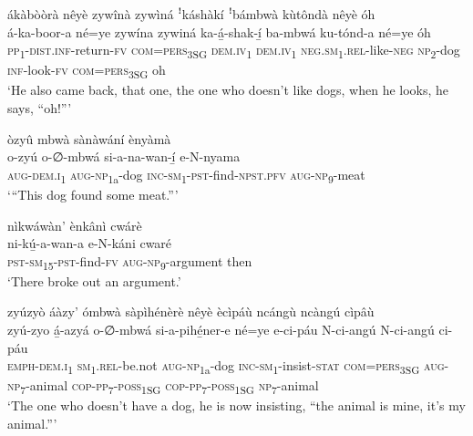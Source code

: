 ákàbòòrà nêyè zywînà zywìná ꜝkáshàkí ꜝbámbwà kùtôndà nêyè óh\\
\gll á-ka-boor-a      né=ye    zywína zywiná  ka-á̲-shak-í̲      ba-mbwá  ku-tónd-a  né=ye    óh \\
\textsc{pp}\textsubscript{1}{}-\textsc{dist}.\textsc{inf}{}-return-\textsc{fv}  \textsc{com}=\textsc{pers}\textsubscript{3SG}  \textsc{dem}.\textsc{iv}\textsubscript{1}
\textsc{dem}.\textsc{iv}\textsubscript{1} \textsc{neg}.\textsc{sm}\textsubscript{1}.\textsc{rel}{}-like-\textsc{neg}  \textsc{np}\textsubscript{2}{}-dog  \textsc{inf}{}-look-\textsc{fv}  \textsc{com}=\textsc{pers}\textsubscript{3SG} oh\\
\glt ‘He also came back, that one, the one who doesn’t like dogs, when he looks, he says, “oh!”’\bigskip

\newpage
òzyû mbwà sànàwání ènyàmà\\
\gll o-zyú    o-∅-mbwá    si-a-na-wan-í̲      e-N-nyama\\
\textsc{aug}{}-\textsc{dem}.\textsc{i}\textsubscript{1}  \textsc{aug}{}-\textsc{np}\textsubscript{1a}{}-dog  \textsc{inc}{}-\textsc{sm}\textsubscript{1}{}-\textsc{pst}{}-find-\textsc{npst}.\textsc{pfv}  \textsc{aug}{}-\textsc{np}\textsubscript{9}{}-meat\\
\glt ‘“This dog found some meat.”’\bigskip

nìkwáwàn’ ènkânì cwárè\\
\gll ni-kú̲-a-wan-a    e-N-káni    cwaré\\
\textsc{pst}{}-\textsc{sm}\textsubscript{15}{}-\textsc{pst}{}-find-\textsc{fv}  \textsc{aug}{}-\textsc{np}\textsubscript{9}{}-argument  then\\
\glt ‘There broke out an argument.’\bigskip

zyúzyò áàzy’ ómbwà sàpìhénèrè nêyè ècìpáù ncángù ncàngú cìpâù\\
\gll zyú-zyo  á̲-azyá      o-∅-mbwá    si-a-pihé̲ner-e né=ye    e-ci-páu    N-ci-angú    N-ci-angú    ci-páu \\
\textsc{emph}{}-\textsc{dem}.\textsc{i}\textsubscript{1}  \textsc{sm}\textsubscript{1}.\textsc{rel}{}-be.not  \textsc{aug}{}-\textsc{np}\textsubscript{1a}{}-dog  \textsc{inc}{}-\textsc{sm}\textsubscript{1}{}-insist-\textsc{stat}
\textsc{com}=\textsc{pers}\textsubscript{3SG} \textsc{aug}{}-\textsc{np}\textsubscript{7}{}-animal  \textsc{cop}{}-\textsc{pp}\textsubscript{7}{}-\textsc{poss}\textsubscript{1SG} \textsc{cop}{}-\textsc{pp}\textsubscript{7}{}-\textsc{poss}\textsubscript{1SG} \textsc{np}\textsubscript{7}{}-animal\\
\glt ‘The one who doesn’t have a dog, he is now insisting, “the animal is mine, it’s my animal.”’\bigskip

